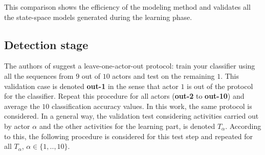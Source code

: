 \documentclass[letterpaper, 10 pt, conference]{ieeeconf}  %
\begin{document}
This comparison shows the efficiency of the modeling method and validates all the state-space models generated during the learning phase.

\subsection{Detection stage}

The authors of \cite{sei13} suggest a leave-one-actor-out protocol: train your classifier using all the sequences from $9$ out of $10$ actors and test on the remaining $1$. This validation case is denoted \textbf{out-1} in the sense that actor $1$ is out of the protocol for the classifier. Repeat this procedure for all actors (\textbf{out-2} to \textbf{out-10}) and average the $10$ classification accuracy values. In this work, the same protocol is considered. In a general way, the validation test considering activities carried out by actor $\alpha$ and the other activities for the learning part, is denoted $T_\alpha$. According to this, the following procedure is considered for this test step and repeated for all $T_\alpha$, $\alpha \in\{1,..,10\}$.\\ 
\end{document}
